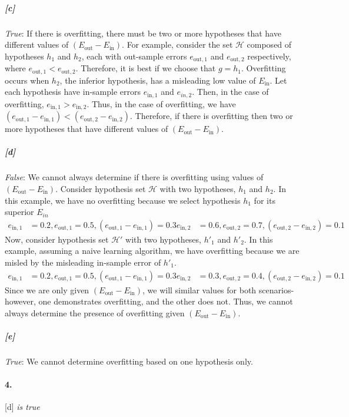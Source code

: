 \documentclass[titlepage]{article}
\begin{document}
	\subparagraph{[c]} \textit{True}: If there is overfitting, there must be two or more hypotheses that have different values of $(E_{\text{out}} - E_{\text{in}})$. For example, consider the set $\mathcal H$ composed of hypotheses $h_1$ and $h_2$, each with out-sample errors $e_{\text{out},1}$ and $e_{\text{out},2}$ respectively, where $e_{\text{out},1} < e_{\text{out},2}$. Therefore, it is best if we choose that $g = h_1$. Overfitting occurs when $h_2$, the inferior hypothesis, has a misleading low value of $E_{\text{in}}$. Let each hypothesis have in-sample errors $e_{\text{in},1}$ and $e_{in, 2}$. Then, in the case of overfitting, $e_{\text{in},1} > e_{\text{in},2}$. Thus, in the case of overfitting, we have $(e_{\text{out},1} - e_{\text{in},1}) < (e_{\text{out},2} - e_{\text{in},2})$. Therefore, if there is overfitting then two or more hypotheses that have different values of $(E_{\text{out}} - E_{\text{in}})$.

	\subparagraph{[d]} \textit{False}: We cannot always determine if there is overfitting using values of $(E_{\text{out}} - E_{\text{in}})$. Consider hypothesis set $\mathcal H$ with two hypotheses, $h_1$ and $h_2$. In this example, we have no overfitting because we select hypothesis $h_1$ for its superior $E_{in}$
	\begin{align*}
	e_{\text{in}, 1} &= 0.2, e_{\text{out}, 1} = 0.5, (e_{\text{out}, 1} - e_{\text{in}, 1}) = 0.3
	e_{\text{in}, 2} &= 0.6, e_{\text{out}, 2} = 0.7, (e_{\text{out}, 2} - e_{\text{in}, 2}) = 0.1
	\end{align*}
	Now, consider hypothesis set $\mathcal H'$ with two hypotheses, $h'_1$ and $h'_2$. In this example, assuming a naive learning algorithm, we have overfitting because we are misled by the misleading in-sample error of $h'_1$.
	\begin{align*}
	e_{\text{in}, 1} &= 0.2, e_{\text{out}, 1} = 0.5, (e_{\text{out}, 1} - e_{\text{in}, 1}) = 0.3
	e_{\text{in}, 2} &= 0.3, e_{\text{out}, 2} = 0.4, (e_{\text{out}, 2} - e_{\text{in}, 2}) = 0.1
	\end{align*}
	Since we are only given $(E_{\text{out}} - E_{\text{in}})$, we will similar values for both scenarios- however, one demonstrates overfitting, and the other does not. Thus, we cannot always determine the presence of overfitting given $(E_{\text{out}} - E_{\text{in}})$.

	\subparagraph{[e]} \textit{True}: We cannot determine overfitting based on one hypothesis only. 

\paragraph{4.} [d] \textit{is true}
\end{document}
